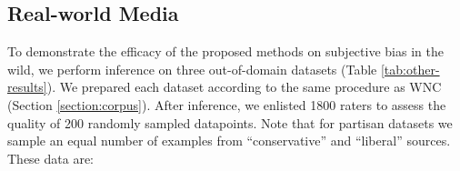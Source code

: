 
\subsection{Real-world Media}


To demonstrate the efficacy of the proposed methods on subjective bias in the wild, we perform inference on three out-of-domain datasets (Table \ref{tab:other-results}). We prepared each dataset according to the same procedure as WNC (Section \ref{section:corpus}). After inference, we enlisted 1800 raters to assess the quality of 200 randomly sampled datapoints.
Note that for partisan datasets we sample an equal number of examples from ``conservative'' and ``liberal'' sources. These data are:

